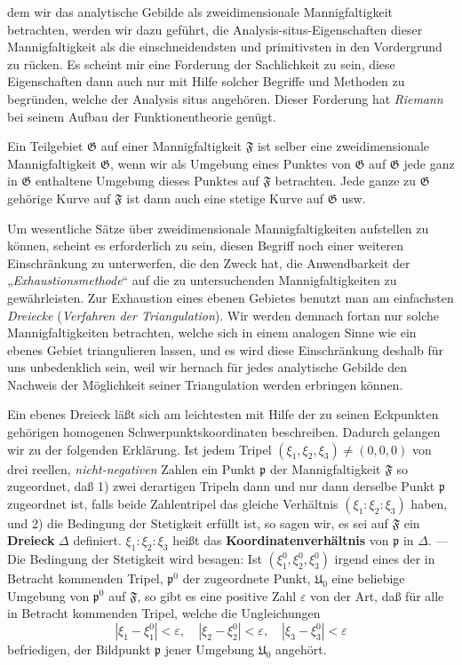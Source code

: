 \documentclass{article}
\begin{document}
dem wir das analytische Gebilde als zweidimensionale Mannigfaltigkeit betrachten, werden wir dazu geführt, die Analysis-situs-Eigenschaften dieser Mannigfaltigkeit als die einschneidendsten und primitivsten in den Vordergrund zu rücken. Es scheint mir eine Forderung der Sachlichkeit zu sein, diese Eigenschaften dann auch nur mit Hilfe solcher Begriffe und Methoden zu begründen, welche der Analysis situs angehören. Dieser Forderung hat \emph{Riemann} bei seinem Aufbau der Funktionentheorie genügt.

Ein Teilgebiet $\mathfrak{G}$ auf einer Mannigfaltigkeit $\mathfrak{F}$ ist selber eine zweidimensionale Mannigfaltigkeit $\mathfrak{G}$, wenn wir als Umgebung eines Punktes von $\mathfrak{G}$ auf $\mathfrak{G}$ jede ganz in $\mathfrak{G}$ enthaltene Umgebung dieses Punktes auf $\mathfrak{F}$ betrachten. Jede ganze zu $\mathfrak{G}$ gehörige Kurve auf $\mathfrak{F}$ ist dann auch eine stetige Kurve auf $\mathfrak{G}$ usw.

Um wesentliche Sätze über zweidimensionale Mannigfaltigkeiten aufstellen zu können, scheint es erforderlich zu sein, diesen Begriff noch einer weiteren Einschränkung zu unterwerfen, die den Zweck hat, die Anwendbarkeit der „\emph{Exhaustionsmethode}“ auf die zu untersuchenden Mannigfaltigkeiten zu gewährleisten. Zur Exhaustion eines ebenen Gebietes benutzt man am einfachsten \emph{Dreiecke} (\emph{Verfahren der Triangulation}). Wir werden demnach fortan nur solche Mannigfaltigkeiten betrachten, welche sich in einem analogen Sinne wie ein ebenes Gebiet triangulieren lassen, und es wird diese Einschränkung deshalb für uns unbedenklich sein, weil wir hernach für jedes analytische Gebilde den Nachweis der Möglichkeit seiner Triangulation werden erbringen können.

Ein ebenes Dreieck läßt sich am leichtesten mit Hilfe der zu seinen Eckpunkten gehörigen homogenen Schwerpunktskoordinaten beschreiben. Dadurch gelangen wir zu der folgenden Erklärung. Ist jedem Tripel $(\xi_1, \xi_2, \xi_3) \ne (0, 0, 0)$ von drei reellen, \emph{nicht-negativen} Zahlen ein Punkt $\mathfrak{p}$ der Mannigfaltigkeit $\mathfrak{F}$ so zugeordnet, daß 1) zwei derartigen Tripeln dann und nur dann derselbe Punkt $\mathfrak{p}$ zugeordnet ist, falls beide Zahlentripel das gleiche Verhältnis $(\xi_1 : \xi_2 : \xi_3)$ haben, und 2) die Bedingung der Stetigkeit erfüllt ist, so sagen wir, es sei auf $\mathfrak{F}$ ein \textbf{Dreieck} $\Delta$ definiert. $\xi_1 : \xi_2 : \xi_3$ heißt das \textbf{Koordinatenverhältnis} von $\mathfrak{p}$ in $\Delta$. --- Die Bedingung der Stetigkeit wird besagen: Ist $(\xi_1^0, \xi_2^0, \xi_3^0)$ irgend eines der in Betracht kommenden Tripel, $\mathfrak{p}^0$ der zugeordnete Punkt, $\mathfrak{U}_0$ eine beliebige Umgebung von $\mathfrak{p}^0$ auf $\mathfrak{F}$, so gibt es eine positive Zahl $\varepsilon$ von der Art, daß für alle in Betracht kommenden Tripel, welche die Ungleichungen
\[
|\xi_1 - \xi_1^0| < \varepsilon, \quad |\xi_2 - \xi_2^0| < \varepsilon, \quad |\xi_3 - \xi_3^0| < \varepsilon
\]
befriedigen, der Bildpunkt $\mathfrak{p}$ jener Umgebung $\mathfrak{U}_0$ angehört.
\end{document}
